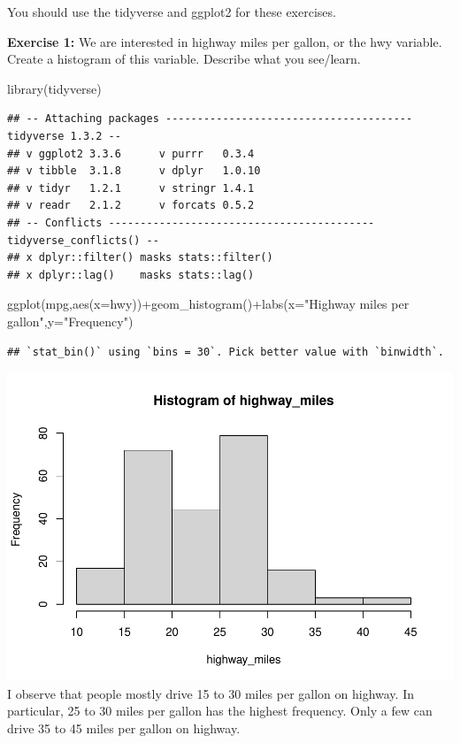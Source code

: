 \documentclass[
]{article}
\newenvironment{Shaded}{\begin{snugshade}}{\end{snugshade}}
\newcommand{\AttributeTok}[1]{\textcolor[rgb]{0.77,0.63,0.00}{#1}}
\newcommand{\FunctionTok}[1]{\textcolor[rgb]{0.00,0.00,0.00}{#1}}
\newcommand{\NormalTok}[1]{#1}
\newcommand{\SpecialCharTok}[1]{\textcolor[rgb]{0.00,0.00,0.00}{#1}}
\newcommand{\StringTok}[1]{\textcolor[rgb]{0.31,0.60,0.02}{#1}}
\begin{document}
You should use the tidyverse and ggplot2 for these exercises.

\textbf{Exercise 1:} We are interested in highway miles per gallon, or
the hwy variable. Create a histogram of this variable. Describe what you
see/learn.

\begin{Shaded}
\begin{Highlighting}[]
\FunctionTok{library}\NormalTok{(tidyverse)}
\end{Highlighting}
\end{Shaded}

\begin{verbatim}
## -- Attaching packages --------------------------------------- tidyverse 1.3.2 --
## v ggplot2 3.3.6      v purrr   0.3.4 
## v tibble  3.1.8      v dplyr   1.0.10
## v tidyr   1.2.1      v stringr 1.4.1 
## v readr   2.1.2      v forcats 0.5.2 
## -- Conflicts ------------------------------------------ tidyverse_conflicts() --
## x dplyr::filter() masks stats::filter()
## x dplyr::lag()    masks stats::lag()
\end{verbatim}

\begin{Shaded}
\begin{Highlighting}[]
\FunctionTok{ggplot}\NormalTok{(mpg,}\FunctionTok{aes}\NormalTok{(}\AttributeTok{x=}\NormalTok{hwy))}\SpecialCharTok{+}\FunctionTok{geom\_histogram}\NormalTok{()}\SpecialCharTok{+}\FunctionTok{labs}\NormalTok{(}\AttributeTok{x=}\StringTok{"Highway miles per gallon"}\NormalTok{,}\AttributeTok{y=}\StringTok{"Frequency"}\NormalTok{)}
\end{Highlighting}
\end{Shaded}

\begin{verbatim}
## `stat_bin()` using `bins = 30`. Pick better value with `binwidth`.
\end{verbatim}

\includegraphics{PSTAT131-HW1_files/figure-latex/unnamed-chunk-1-1.pdf}
I observe that people mostly drive 15 to 30 miles per gallon on highway.
In particular, 25 to 30 miles per gallon has the highest frequency. Only
a few can drive 35 to 45 miles per gallon on highway.
\end{document}
